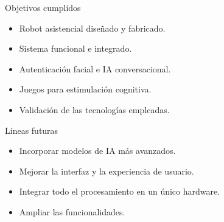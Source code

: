 \documentclass{beamer}
\begin{document}
\begin{frame}
\begin{block}{Objetivos cumplidos}
\begin{itemize}


\item \alert{Robot asistencial} diseñado y fabricado.
\item Sistema  \alert{funcional} e \alert{integrado}.
\item Autenticación facial e IA conversacional.
\item Juegos para estimulación cognitiva.
\item Validación de las tecnologías empleadas.
\end{itemize}
\end{block}


\begin{block}{Líneas futuras}
\begin{itemize}
\item Incorporar modelos de \alert{IA} más \alert{avanzados}.
\item Mejorar la interfaz y la experiencia de usuario.
\item Integrar todo el procesamiento en un \alert{único hardware}.
\item \alert{Ampliar las funcionalidades}.
\end{itemize}
\end{block}
\end{frame}

\begin{frame}[plain]
\large{\titlepage}
\end{frame}
\end{document}

